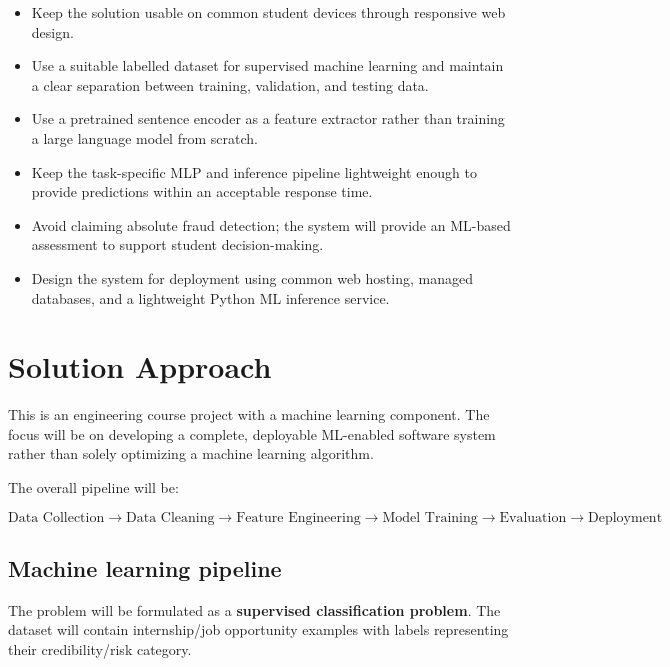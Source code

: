 \documentclass[11pt,a4paper]{article}
\newcommand{\BvrHint}[1]{%
  {\normalfont\normalsize\itshape\hfill #1}}
\begin{document}
\begin{itemize}[leftmargin=0.7cm]

    \item Keep the solution usable on common student devices through
    responsive web design.

    \item Use a suitable labelled dataset for supervised machine learning
    and maintain a clear separation between training, validation, and testing
    data.

    \item Use a pretrained sentence encoder as a feature extractor rather
    than training a large language model from scratch.

    \item Keep the task-specific MLP and inference pipeline lightweight enough
    to provide predictions within an acceptable response time.

    \item Avoid claiming absolute fraud detection; the system will provide
    an ML-based assessment to support student decision-making.

    \item Design the system for deployment using common web hosting,
    managed databases, and a lightweight Python ML inference service.
\end{itemize}

\section{Solution Approach%
\BvrHint{}}

This is an engineering course project with a machine learning component.
The focus will be on developing a complete, deployable ML-enabled software
system rather than solely optimizing a machine learning algorithm.

The overall pipeline will be:

\[
\text{Data Collection}
\rightarrow
\text{Data Cleaning}
\rightarrow
\text{Feature Engineering}
\rightarrow
\text{Model Training}
\rightarrow
\text{Evaluation}
\rightarrow
\text{Deployment}
\]

\subsection{Machine learning pipeline%
\BvrHint{}}

The problem will be formulated as a \textbf{supervised classification problem}.
The dataset will contain internship/job opportunity examples with labels
representing their credibility/risk category.
\end{document}
